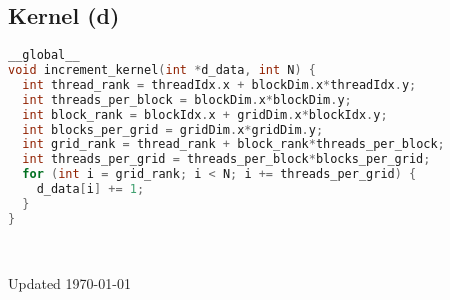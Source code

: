 \documentclass[]{article}
\begin{document}
%
%
%
%

\subsection{Kernel (d)}
\begin{tcolorbox}[left=14pt, arc=0pt, outer arc=0pt, colframe=blue!5, colback=yellow!5]
\begin{lstlisting}[language=C]
__global__
void increment_kernel(int *d_data, int N) {
  int thread_rank = threadIdx.x + blockDim.x*threadIdx.y;
  int threads_per_block = blockDim.x*blockDim.y;
  int block_rank = blockIdx.x + gridDim.x*blockIdx.y;
  int blocks_per_grid = gridDim.x*gridDim.y;
  int grid_rank = thread_rank + block_rank*threads_per_block;
  int threads_per_grid = threads_per_block*blocks_per_grid;
  for (int i = grid_rank; i < N; i += threads_per_grid) {
    d_data[i] += 1;
  }
}
\end{lstlisting}
\end{tcolorbox}
\\
%
%
%
%

\vfill
\begin{tiny}Updated \today \end{tiny}
\end{document}
